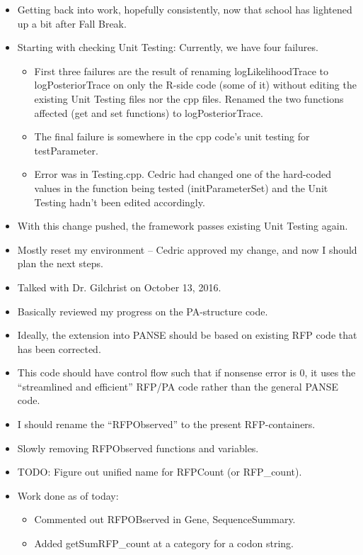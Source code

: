 \documentclass[12pt,hyperref]{labbook}
\begin{document}
\begin{itemize}
    \item Getting back into work, hopefully consistently, now that school has lightened up a bit after Fall Break.
    \item Starting with checking Unit Testing: Currently, we have four failures.
    \begin{itemize}
        \item First three failures are the result of renaming logLikelihoodTrace to logPosteriorTrace on only the R-side code (some of it) without editing the existing Unit Testing files nor the cpp files.
        Renamed the two functions affected (get and set functions) to logPosteriorTrace.
        \item The final failure is somewhere in the cpp code's unit testing for testParameter.
        \item Error was in Testing.cpp.
        Cedric had changed one of the hard-coded values in the function being tested (initParameterSet) and the Unit Testing hadn't been edited accordingly.
    \end{itemize}
    \item With this change pushed, the framework passes existing Unit Testing again.
\end{itemize}


\begin{itemize}
    \item Mostly reset my environment -- Cedric approved my change, and now I should plan the next steps.
    \item Talked with Dr. Gilchrist on October 13, 2016.
    \item Basically reviewed my progress on the PA-structure code.
    \item Ideally, the extension into PANSE should be based on existing RFP code that has been corrected.
    \item This code should have control flow such that if nonsense error is 0, it uses the \enquote{streamlined and efficient} RFP/PA code rather than the general PANSE code.
    \item I should rename the \enquote{RFPObserved} to the present RFP-containers.
\end{itemize}


\begin{itemize}
    \item Slowly removing RFPObserved functions and variables.
    \item TODO: Figure out unified name for RFPCount (or RFP\_count).
    \item Work done as of today:
    \begin{itemize}
        \item Commented out RFPOBserved in Gene, SequenceSummary.
        \item Added getSumRFP\_count at a category for a codon string.
    \end{itemize}
\end{itemize}
\end{document}
